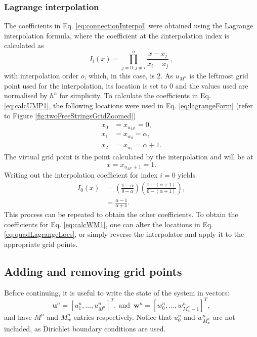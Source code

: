 \subsubsection{Lagrange interpolation}
The coefficients in Eq. \eqref{eq:connectionInterpol} were obtained using the Lagrange interpolation formula, where the coefficient at the $i$\th interpolation index is calculated as
\begin{equation}\label{eq:lagrangeForm}
    I_i(x) = \prod_{j = 0, j\neq i}^o \frac{x-x_j}{x_i-x_j}\ ,
\end{equation}
with interpolation order $o$, which, in this case, is $2$. As $u_{M^n}$ is the leftmost grid point used for the interpolation, its location is set to $0$ and the values used are normalised by $h^n$ for simplicity. To calculate the coefficients in Eq. \eqref{eq:calcUMP1}, the following locations were used in Eq. \eqref{eq:lagrangeForm} (refer to Figure \ref{fig:twoFreeStringsGridZoomed})
\begin{equation}\label{eq:quadLagrangeLocs}
    \begin{aligned}
     x_0 &= x_{u_{M^n}} = 0, \\
     x_1 &= x_{w_0} = \alpha, \\
     x_2& = x_{w_1} = \alpha + 1.
    \end{aligned}
\end{equation}
The virtual grid point is the point calculated by the interpolation and will be at
\begin{equation}
    x = x_{u_{M^n}+1} = 1.
\end{equation}
Writing out the interpolation coefficient for index $i=0$ yields
\begin{align*}
    I_0(x)&= \left(\frac{1-\alpha}{0-\alpha}\right)\left(\frac{1-(\alpha+1)}{0-(\alpha+1)}\right), \\
    &=\frac{\alpha-1}{\alpha+1}.
\end{align*}
This process can be repeated to obtain the other coefficients. To obtain the coefficients for Eq. \eqref{eq:calcWM1}, one can alter the locations in Eq. \eqref{eq:quadLagrangeLocs}, or simply reverse the interpolator and apply it to the appropriate grid points. 

\subsection{Adding and removing grid points}\label{sec:addRemove}
Before continuing, it is useful to write the state of the system in vectors:
\begin{equation}
    \label{eq:separateStateVectors}
     \mathbf{u}^n = [u_1^n, \hdots, u_{M^n}^n]^T\!, \  \text{and} \ \; \mathbf{w}^n = [w_0^n, \hdots, w_{M_w^n-1}^n]^T,
\end{equation}
and have $M^n$ and $M_w^n$ entries respectively. Notice that $u_0^n$ and $w_{M_w^n}^n$ are not included, as Dirichlet boundary conditions are used.



